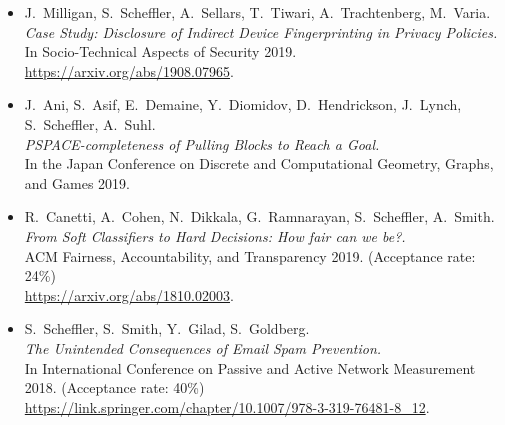 \documentclass{res}
\begin{document}
\begin{resume}
\begin{itemize}
\item[\devicefingerprinting] J.~Milligan, S.~Scheffler, A.~Sellars, T.~Tiwari, A.~Trachtenberg, M.~Varia.  \\
\emph{Case Study: Disclosure of Indirect Device Fingerprinting in Privacy Policies.} \\
In Socio-Technical Aspects of Security 2019. \\
\url{https://arxiv.org/abs/1908.07965}.

\item[\pullingblocks] J.~Ani, S.~Asif, E.~Demaine, Y.~Diomidov, D.~Hendrickson, J.~Lynch, S.~Scheffler, A.~Suhl. \\
\emph{PSPACE-completeness of Pulling Blocks to Reach a Goal.}  \\
In the Japan Conference on Discrete and Computational Geometry, Graphs, and Games 2019.

\item[\fairsibility] R.~Canetti, A.~Cohen, N.~Dikkala, G.~Ramnarayan, S.~Scheffler, A.~Smith. \\
\emph{From Soft Classifiers to Hard Decisions: How fair can we be?.} \\
ACM Fairness, Accountability, and Transparency 2019. (Acceptance rate: 24\%) \\
\url{https://arxiv.org/abs/1810.02003}.

\item[\emailspam] S.~Scheffler, S.~Smith, Y.~Gilad, S.~Goldberg. \\
\emph{The Unintended Consequences of Email Spam Prevention.} \\
In International Conference on Passive and Active Network Measurement 2018. (Acceptance rate: 40\%) \\
\url{https://link.springer.com/chapter/10.1007/978-3-319-76481-8\_12}.
\end{itemize}

%
%
%
%
%
%
%


\end{resume}
\end{document}
